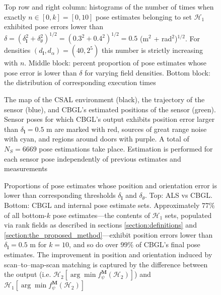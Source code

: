 \begin{figure}
  \vspace{-0.3cm}
  
  \vspace{-0.3cm}
  \caption{\small Top row and right column: histograms of the number of times
           when exactly $n \in [0,k] = [0,10]$ pose estimates belonging to set
           $\mathcal{H}_1$ exhibited pose errors lower than $\delta =
           (\delta_{\bm{l}}^2 + \delta_{\theta}^2)^{1/2} =  (0.3^2 +
           0.4^2)^{1/2} = 0.5$ (m$^2$ + rad$^2$)$^{1/2}$. For densities
           $(d_{\bm{l}},d_{\alpha}) = (40, 2^5)$ this number is strictly
           increasing with $n$. Middle block: percent proportion of pose
           estimates whose pose error is lower than $\delta$ for varying field
           densities. Bottom block: the distribution of corresponding execution
           times}
  \vspace{-0.5cm}
  \label{fig:a:determine_40_32}
\end{figure}


\begin{figure}
  
  \vspace{-0.7cm}
  \caption{\small The map of the CSAL environment (black), the trajectory of
           the sensor (blue), and CBGL's estimated positions of the sensor
           (green). Sensor poses for which CBGL's output exhibits position error
           larger than $\delta_{\bm{l}} = 0.5$ m are marked with red, sources
           of great range noise with cyan, and regions around doors with
           purple. A total of $N_S = 6669$ pose estimations take place.
           Estimation is performed for each sensor pose independently of
           previous estimates and measurements}
  \vspace{-0.5cm}
  \label{fig:a:map_and_trajectory}
\end{figure}

\begin{figure}
  \vspace{-0.4cm}
  
  \vspace{0.01cm}
  \caption{\small Proportions of pose estimates whose position and orientation
           error is lower than corresponding thresholds $\delta_{\bm{l}}$ and
           $\delta_{\theta}$. Top: ALS vs CBGL. Bottom: CBGL and internal pose
           estimate sets.  Approximately $77\%$ of all bottom-$k$ pose
           estimates---the contents of $\mathcal{H}_1$ sets, populated via rank
           fields as described in sections \ref{section:definitions} and
           \ref{section:the_proposed_method}---exhibit position errors lower
           than $\delta_{\bm{l}} = 0.5$ m for $k=10$, and so do over $99\%$ of
           CBGL's final pose estimates. The improvement in position and
           orientation induced by scan--to--map-scan matching is captured by
           the difference between the output (i.e.  $\mathcal{H}_2[\arg \min
           f_{\psi}^{\bm{M}}(\mathcal{H}_2)]$) and $\mathcal{H}_1[\arg \min
           f_{\psi}^{\bm{M}}(\mathcal{H}_2)]$}
  \vspace{-0.5cm}
  \label{fig:a:awesomeness}
\end{figure}


